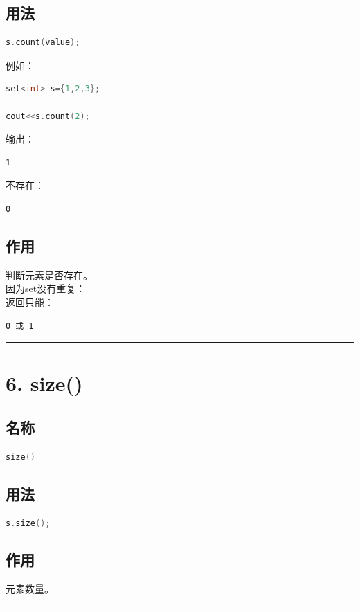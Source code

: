 \documentclass[9pt,twocolumn]{extarticle}
\begin{document}
\subsection{用法}
\begin{lstlisting}[language=C++]
s.count(value);
\end{lstlisting}
例如：
\begin{lstlisting}[language=C++]
set<int> s={1,2,3};

cout<<s.count(2);
\end{lstlisting}
输出：
\begin{lstlisting}
1
\end{lstlisting}
不存在：
\begin{lstlisting}
0
\end{lstlisting}

\subsection{作用}
判断元素是否存在。\\
因为set没有重复：\\
返回只能：
\begin{lstlisting}
0 或 1
\end{lstlisting}

\noindent\rule{\linewidth}{0.4pt}

\section{6. size()}

\subsection{名称}
\begin{lstlisting}[language=C++]
size()
\end{lstlisting}

\subsection{用法}
\begin{lstlisting}[language=C++]
s.size();
\end{lstlisting}

\subsection{作用}
元素数量。

\noindent\rule{\linewidth}{0.4pt}
\end{document}
